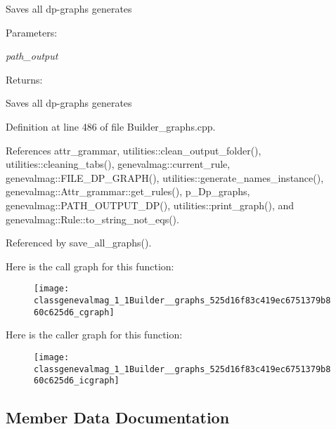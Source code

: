 Saves all dp-graphs generates \begin{Desc}
\item[Parameters:]
\begin{description}
\item[{\em path\_\-output}]\end{description}
\end{Desc}
\begin{Desc}
\item[Returns:]\end{Desc}
Saves all dp-graphs generates 

Definition at line 486 of file Builder\_\-graphs.cpp.

References attr\_\-grammar, utilities::clean\_\-output\_\-folder(), utilities::cleaning\_\-tabs(), genevalmag::current\_\-rule, genevalmag::FILE\_\-DP\_\-GRAPH(), utilities::generate\_\-names\_\-instance(), genevalmag::Attr\_\-grammar::get\_\-rules(), p\_\-Dp\_\-graphs, genevalmag::PATH\_\-OUTPUT\_\-DP(), utilities::print\_\-graph(), and genevalmag::Rule::to\_\-string\_\-not\_\-eqs().

Referenced by save\_\-all\_\-graphs().

Here is the call graph for this function:\nopagebreak
\begin{figure}[H]
\begin{center}
\leavevmode
\texttt{[image: classgenevalmag\_1\_1Builder\_\_graphs\_525d16f83c419ec6751379b860c625d6\_cgraph]}
\end{center}
\end{figure}


Here is the caller graph for this function:\nopagebreak
\begin{figure}[H]
\begin{center}
\leavevmode
\texttt{[image: classgenevalmag\_1\_1Builder\_\_graphs\_525d16f83c419ec6751379b860c625d6\_icgraph]}
\end{center}
\end{figure}


\subsection{Member Data Documentation}
\hypertarget{classgenevalmag_1_1Builder__graphs_10e4acb76015aeea26cf61980a3c6e33}{
\subsubsection[{attr\_\-grammar}]{}}
\label{classgenevalmag_1_1Builder__graphs_10e4acb76015aeea26cf61980a3c6e33}


